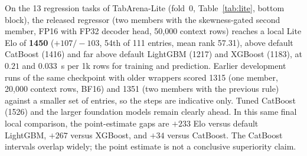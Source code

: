 \documentclass[11pt]{article}
\begin{document}
On the 13 regression tasks of TabArena-Lite (fold~0, Table~\ref{tab:lite}, bottom block), the released regressor (two members with the skewness-gated second member, FP16 with FP32 decoder head, 50{,}000 context rows) reaches a local Lite Elo of \textbf{1450} ($+107/-103$, 54th of 111 entries, mean rank 57.31), above default CatBoost (1416) and far above default LightGBM (1217) and XGBoost (1183), at $0.21$ and $0.033$~s per 1k rows for training and prediction. Earlier development runs of the same checkpoint with older wrappers scored 1315 (one member, 20{,}000 context rows, BF16) and 1351 (two members with the previous rule) against a smaller set of entries, so the steps are indicative only. Tuned CatBoost (1526) and the larger foundation models remain clearly ahead. %
In this same final local comparison, the point-estimate gaps are $+233$ Elo versus default LightGBM, $+267$ versus XGBoost, and $+34$ versus CatBoost. The CatBoost intervals overlap widely; the point estimate is not a conclusive superiority claim. %
\end{document}

